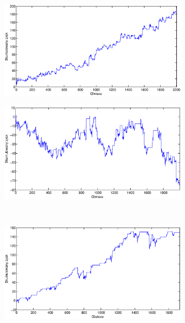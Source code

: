 \begin{figure}[h]
\centering
\begin{minipage}{.49\linewidth}
\centering
\includegraphics[width=0.82\textwidth]{images/S1a_fus500.eps}
\label{jedno}
\end{minipage}
\begin{minipage}{.49\linewidth}
\centering
\includegraphics[width=0.82\textwidth]{images/S1b_fus500.eps}
\label{dwu}
\end{minipage}
\\
\begin{minipage}{.49\linewidth}
\centering
\includegraphics[width=0.82\textwidth]{images/S1c_fus500.eps}
\label{cztero}
\end{minipage}
\begin{minipage}{.49\linewidth}

\end{minipage}
\end{figure}
